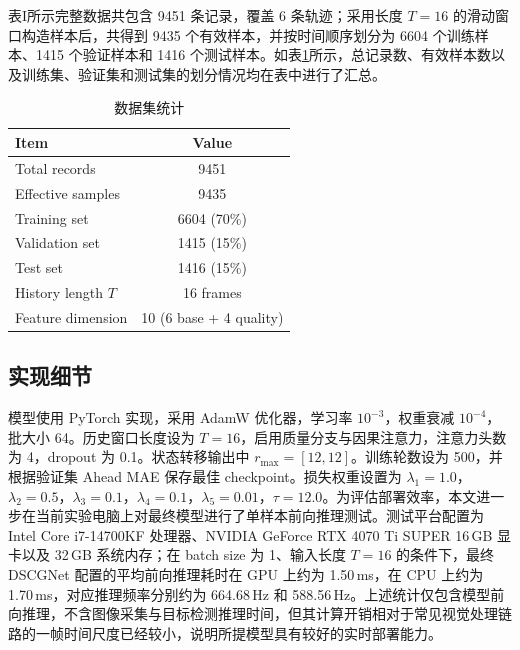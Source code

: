 \documentclass[journal]{IEEEtran}
\begin{document}
表I所示完整数据共包含 9451 条记录，覆盖 6 条轨迹；采用长度 $T=16$ 的滑动窗口构造样本后，共得到 9435 个有效样本，并按时间顺序划分为 6604 个训练样本、1415 个验证样本和 1416 个测试样本。如表\ref{tab:dataset}所示，总记录数、有效样本数以及训练集、验证集和测试集的划分情况均在表中进行了汇总。

\begin{table}[H]
\centering
\caption{数据集统计}
\label{tab:dataset}
\begin{tabular}{lc}
\toprule
\textbf{Item} & \textbf{Value} \\
\midrule
Total records & 9451 \\
Effective samples & 9435 \\
Training set & 6604 (70\%) \\
Validation set & 1415 (15\%) \\
Test set & 1416 (15\%) \\
History length $T$ & 16 frames \\
Feature dimension & 10 (6 base + 4 quality) \\
\bottomrule
\end{tabular}
\end{table}

\subsection{实现细节}
模型使用 PyTorch 实现，采用 AdamW 优化器，学习率 $10^{-3}$，权重衰减 $10^{-4}$，批大小 64。历史窗口长度设为 $T=16$，启用质量分支与因果注意力，注意力头数为 4，dropout 为 0.1。状态转移输出中 $r_{\max}=[12,12]$。训练轮数设为 500，并根据验证集 Ahead MAE 保存最佳 checkpoint。损失权重设置为 $\lambda_1=1.0$，$\lambda_2=0.5$，$\lambda_3=0.1$，$\lambda_4=0.1$，$\lambda_5=0.01$，$\tau=12.0$。为评估部署效率，本文进一步在当前实验电脑上对最终模型进行了单样本前向推理测试。测试平台配置为 Intel Core i7-14700KF 处理器、NVIDIA GeForce RTX 4070 Ti SUPER 16\,GB 显卡以及 32\,GB 系统内存；在 batch size 为 1、输入长度 $T=16$ 的条件下，最终 DSCGNet 配置的平均前向推理耗时在 GPU 上约为 1.50\,ms，在 CPU 上约为 1.70\,ms，对应推理频率分别约为 664.68\,Hz 和 588.56\,Hz。上述统计仅包含模型前向推理，不含图像采集与目标检测推理时间，但其计算开销相对于常见视觉处理链路的一帧时间尺度已经较小，说明所提模型具有较好的实时部署能力。
\end{document}

